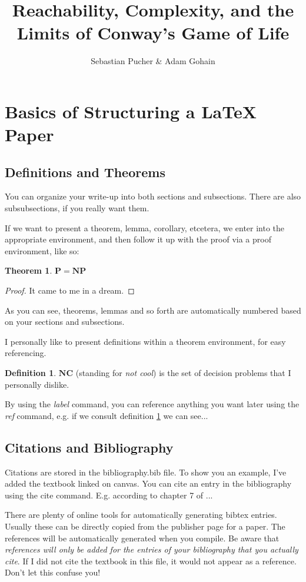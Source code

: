 \documentclass{article}
\title{Reachability, Complexity, and the Limits of Conway's Game of Life}
\author{Sebastian Pucher \& Adam Gohain}
\theoremstyle{definition}
\newtheorem{definition}{Definition}[section]
\theoremstyle{plain}
\theoremstyle{plain}
\newtheorem{theorem}{Theorem}[section]
\begin{document}
\maketitle

\tableofcontents

\newpage

\section{Basics of Structuring a LaTeX Paper}

\subsection{Definitions and Theorems}
You can organize your write-up into both sections and subsections. There are also subsubsections, if you really want them. 

If we want to present a theorem, lemma, corollary, etcetera, we enter into the appropriate environment, and then follow it up with the proof via a proof environment, like so:

\begin{theorem}
    $\mathbf{P} = \mathbf{NP}$
\end{theorem}

\begin{proof}
    It came to me in a dream.
\end{proof}

As you can see, theorems, lemmas and so forth are automatically numbered based on your sections and subsections. 

I personally like to present definitions within a theorem environment, for easy referencing.
\begin{definition}\label{NC}
    $\mathbf{NC}$ (standing for \emph{not cool}) is the set of decision problems that I personally dislike. 
\end{definition}

By using the \emph{label} command, you can reference anything you want later using the \emph{ref} command, e.g. if we consult definition \ref{NC} we can see...

\subsection{Citations and Bibliography}

Citations are stored in the bibliography.bib file. To show you an example, I've added the textbook linked on canvas. You can cite an entry in the bibliography using the cite command. E.g. according to chapter 7 of \cite{papadimitriouComputationalComplexity1994}...

There are plenty of online tools for automatically generating bibtex entries. Usually these can be directly copied from the publisher page for a paper. The references will be automatically generated when you compile. Be aware that \emph{references will only be added for the entries of your bibliography that you actually cite}. If I did not cite the textbook in this file, it would not appear as a reference. Don't let this confuse you!
\printbibliography
\end{document}
